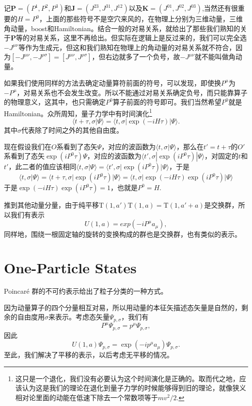 记$\bm{P}=(P^1,P^2,P^3)$和$\bm{J}=(J^{23},J^{31},J^{12})$以及$\bm{K}=(J^{01},J^{02},J^{03})$,当然还有很重要的$H=P^0$，上面的那些符号不是空穴来风的，在物理上分别为三维动量，三维角动量，boost和Hamiltonian。结合一般的对易关系，就给出了那些我们熟知的关于$\bm{P}$等的对易关系，这里不再给出。但实际在逻辑上是反过来的，我们可以完全选$-J^{\mu\nu}$等作为生成元，但这和我们熟知在物理上的角动量的对易关系就不符合，因为$[-J^{\mu\nu},-J^{\rho\sigma}]=[J^{\mu\nu},J^{\rho\sigma}]$，但右边就多了一个负号，故$-J^{\mu\nu}$就不能叫做角动量。

如果我们使用同样的方法去确定动量算符前面的符号，可以发现，即使换$P^\mu$为$-P^\mu$，对易关系也不会发生改变。所以不能通过对易关系确定负号，而只能靠算子的物理意义，这其中，也只需确定$P^0$算子前面的符号即可。我们当然希望$P^0$就是Hamiltonian。众所周知，量子力学中有时间演化\footnote{这只是一个退化，我们没有必要认为这个时间演化是正确的。取而代之地，应该认为这是我们的理论在退化到量子力学的时候能够得到旧的理论，就像狭义相对论里面的动能在低速下除去一个常数项等于$mv^2/2$.}
\[\langle t+\tau,\sigma|\Psi\rangle=\langle t,\sigma|\exp (-iH\tau)|\Psi\rangle.\]
其中$\sigma$代表除了时间之外的其他自由度。

现在假设我们在$O$系看到了态矢$\Psi$，对应的波函数为$\langle t,\sigma|\Psi\rangle$，那么在$t'=t+\tau$的$O'$系看到了态矢$\exp (iP^0\tau)\Psi$，对应的波函数为$\langle t',\sigma|\exp (iP^0\tau)|\Psi\rangle$，对固定的$t$和$t'$，此二者的值应该相同$\langle t,\sigma|\Psi\rangle=\langle t',\sigma|\exp (iP^0\tau)|\Psi\rangle$，于是
\[
\langle t,\sigma|\Psi\rangle=\langle t+\tau,\sigma|\exp (iP^0\tau)|\Psi\rangle=\langle t,\sigma|\exp (-iH\tau)\exp (iP^0\tau)|\Psi\rangle
\]
于是$\exp (-iH\tau)\exp (iP^0\tau)=1$，也就是$P^0=H$.

推到其他动量分量，由于纯平移$\mathrm{T}(1,a')\mathrm{T}(1,a)=\mathrm{T}(1,a'+a)$是交换群，所以我们有表示
\[
U(1,a)=exp\left(-iP^\mu a_\mu\right),
\]
同样地，围绕一根固定轴的旋转的变换构成的群也是交换群，也有类似的表示。

\section{One-Particle States}

Poincar\'{e} 群的不可约表示给出了粒子分类的一种方式。

因为动量算子的四个分量相互对易，所以用动量的本征矢描述态矢量是自然的，剩余的自由度用$\sigma$来表示。考虑态矢量$\Psi_{p,\sigma}$，我们有
\[
P^\mu\Psi_{p,\sigma}=p^\mu\Psi_{p,\sigma},
\]
因此
\[
U(1,a)\Psi_{p,\sigma}=\exp\left(-ip^\mu a_\mu\right)\Psi_{p,\sigma}.
\]
至此，我们解决了平移的表示，以后考虑无平移的情况。

